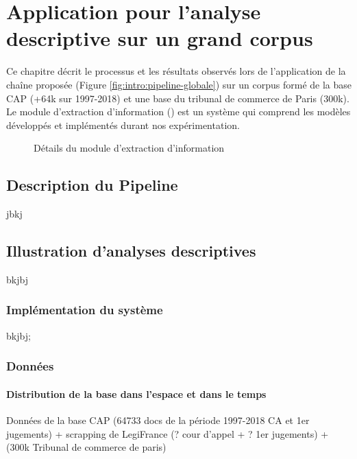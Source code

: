 \chapter{Application pour l'analyse descriptive sur un grand corpus}
\label{chap:demo}
Ce chapitre décrit le processus et les résultats observés lors de l'application de la chaîne proposée (Figure \ref{fig:intro:pipeline-globale}) sur un corpus formé de la base CAP (+64k sur 1997-2018) et une base du tribunal de commerce de Paris (300k). Le module d'extraction d'information () est un système qui comprend les modèles développés et implémentés durant nos expérimentation. 

\begin{figure}[!htb]
	\centering 
	\caption{Détails du module d'extraction d'information}
\end{figure}

 
 
 
\section{Description du Pipeline}
\label{sec:demo:motivation}

jbkj

\section{Illustration d'analyses descriptives}
\label{sec:demo:experimentations}

bkjbj


\subsection{Implémentation du système}

bkjbj;


\subsection{Données}
\subsubsection{Distribution de la base dans l'espace et dans le temps}

Données de la base CAP (64733 docs de la période 1997-2018 CA et 1er jugements) + scrapping de LegiFrance (? cour d'appel + ? 1er jugements) +  (300k Tribunal de commerce de paris)


